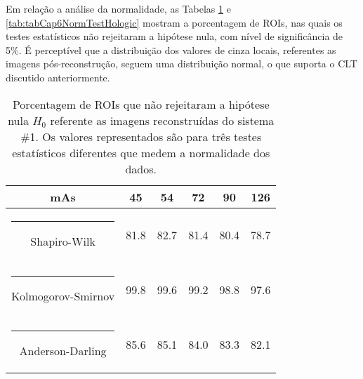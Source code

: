 Em relação a análise da normalidade, as Tabelas \ref{tab:tabCap6NormTestGE} e \ref{tab:tabCap6NormTestHologic} mostram a porcentagem de \acs{ROI}s, nas quais os testes estatísticos não rejeitaram a hipótese nula, com nível de significância de 5\%. É perceptível que a distribuição dos valores de cinza locais, referentes as imagens pós-reconstrução, seguem uma distribuição normal, o que suporta o \acs{CLT} discutido anteriormente.

{\begin{table}[!ht]
		\caption{Porcentagem de \acs{ROI}s que não rejeitaram a hipótese nula $H_0$ referente as imagens reconstruídas do sistema \#1. Os valores representados são para três testes estatísticos diferentes que medem a normalidade dos dados.}
		\label{tab:tabCap6NormTestGE}
		\centering
		\begin{tabular}{c|c|c|c|c|c}
			\rowcolor[HTML]{D4D4D4}
			\textbf{mAs}                   &        \textbf{45}        &                        \textbf{54}&                 \textbf{72}&                 \textbf{90} &                 \textbf{126}      \\
			[1pt]
			\hline
			\hline
			\rule[-0.5ex]{-3pt}{1ex}
			Shapiro-Wilk       & 81.8                                  & 82.7                                                   & 81.4                                                   & 80.4                                                   & 78.7                                                   \\ \hline
			\rule[-0.5ex]{-3pt}{1ex}
			Kolmogorov-Smirnov & 99.8                                                   & 99.6                                                   & 99.2                                                   & 98.8                                                  & 97.6                                                   \\ \hline
			\rule[-0.5ex]{-3pt}{1ex}
			Anderson-Darling   & 85.6                                                   & 85.1                                                   & 84.0                                                   & 83.3                                                   & 82.1                                                   \\ \hline
		\end{tabular}
		\vspace{2ex}
	\end{table}
	
}
